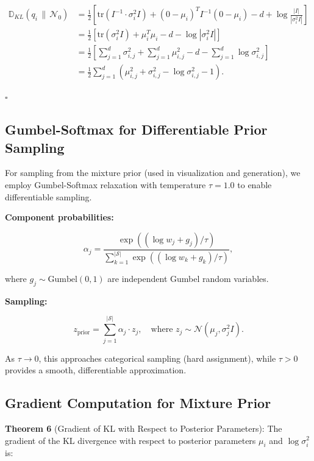 \begin{align}
\mathbb{D}_{KL}(q_i \,\|\, \mathcal{N}_0) &= \frac{1}{2} \left[ \text{tr}(I^{-1} \cdot \sigma_i^2 I) + (0 - \mu_i)^T I^{-1} (0 - \mu_i) - d + \log \frac{|I|}{|\sigma_i^2 I|} \right] \nonumber \\
&= \frac{1}{2} \left[ \text{tr}(\sigma_i^2 I) + \mu_i^T \mu_i - d - \log |\sigma_i^2 I| \right] \nonumber \\
&= \frac{1}{2} \left[ \sum_{j=1}^d \sigma_{i,j}^2 + \sum_{j=1}^d \mu_{i,j}^2 - d - \sum_{j=1}^d \log \sigma_{i,j}^2 \right] \nonumber \\
&= \frac{1}{2} \sum_{j=1}^d \left( \mu_{i,j}^2 + \sigma_{i,j}^2 - \log \sigma_{i,j}^2 - 1 \right).
\end{align}

$\square$

\subsection{Gumbel-Softmax for Differentiable Prior Sampling}

For sampling from the mixture prior (used in visualization and generation), we employ Gumbel-Softmax relaxation \citep{jang2016categorical} with temperature $\tau = 1.0$ to enable differentiable sampling.

\textbf{Component probabilities:}

\begin{equation}
\alpha_j = \frac{\exp((\log w_j + g_j) / \tau)}{\sum_{k=1}^{|\mathcal{S}|} \exp((\log w_k + g_k) / \tau)},
\end{equation}

where $g_j \sim \text{Gumbel}(0, 1)$ are independent Gumbel random variables.

\textbf{Sampling:}

\begin{equation}
z_{\text{prior}} = \sum_{j=1}^{|\mathcal{S}|} \alpha_j \cdot z_j, \quad \text{where } z_j \sim \mathcal{N}(\mu_j, \sigma_j^2 I).
\end{equation}

As $\tau \to 0$, this approaches categorical sampling (hard assignment), while $\tau > 0$ provides a smooth, differentiable approximation.

\subsection{Gradient Computation for Mixture Prior}

\textbf{Theorem 6} (Gradient of KL with Respect to Posterior Parameters): The gradient of the KL divergence with respect to posterior parameters $\mu_i$ and $\log\sigma_i^2$ is:

